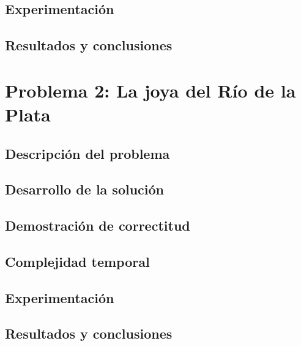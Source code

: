 \documentclass[a4paper, 10pt, twoside]{article}
\begin{document}
\subsection{Experimentación}


\subsection{Resultados y conclusiones}


\newpage



\section{Problema 2: La joya del Río de la Plata}

\subsection{Descripción del problema}


\subsection{Desarrollo de la solución}


\subsection{Demostración de correctitud}


\subsection{Complejidad temporal}


\subsection{Experimentación}


\subsection{Resultados y conclusiones}

\end{document}
